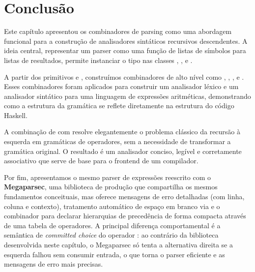 \section{Conclusão}

Este capítulo apresentou os combinadores de parsing como uma
abordagem funcional para a construção de analisadores sintáticos
recursivos descendentes. A ideia central, representar um parser
como uma função de listas de símbolos para listas de resultados,
permite instanciar o tipo  nas
classes ,
,
 e .

A partir dos primitivos  e
, construímos combinadores de alto nível
como ,
, ,
 e .
Esses combinadores foram aplicados para construir um analisador
léxico e um analisador sintático para uma linguagem de expressões
aritméticas, demonstrando como a estrutura da gramática se reflete
diretamente na estrutura do código Haskell.

A combinação de  com
 resolve elegantemente o problema
clássico da recursão à esquerda em gramáticas de operadores, sem a
necessidade de transformar a gramática original. O resultado é um
analisador conciso, legível e corretamente associativo que serve de
base para o frontend de um compilador.

Por fim, apresentamos o mesmo parser de expressões reescrito com o
\textbf{Megaparsec}, uma biblioteca de produção que compartilha os
mesmos fundamentos conceituais, mas oferece mensagens de erro
detalhadas (com linha, coluna e contexto), tratamento automático de
espaço em branco via  e o combinador
 para declarar hierarquias de
precedência de forma compacta através de uma tabela de operadores. A
principal diferença comportamental é a semântica de \emph{committed
choice} do operador \haskell{<|>}: ao contrário da
biblioteca desenvolvida neste capítulo, o Megaparsec só tenta a
alternativa direita se a esquerda falhou sem consumir entrada, o que
torna o parser eficiente e as mensagens de erro mais precisas.
